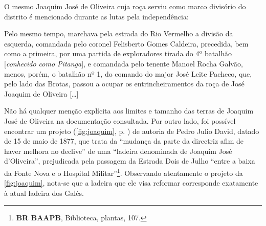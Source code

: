 O mesmo Joaquim José de Oliveira cuja roça serviu como marco divisório do distrito é mencionado durante as lutas pela independência:

\begin{citacao}
Pelo mesmo tempo, marchava pela estrada do Rio Vermelho a divisão da esquerda, comandada pelo coronel Felisberto Gomes Caldeira, precedida, bem como a primeira, por uma partida de exploradores tirada do 4º batalhão [\textit{conhecido como Pitanga}], e comandada pelo tenente Manoel Rocha Galvão, menos, porém, o batalhão nº 1, do comando do major José Leite Pacheco, que, pelo lado das Brotas, passou a ocupar os entrincheiramentos da roça de José Joaquim de Oliveira [\dots] \cite[p.~58]{vieira_memorias_1903}
\end{citacao}

Não há qualquer menção explícita aos limites e tamanho das terras de Joaquim José de Oliveira na documentação consultada. Por outro lado, foi possível encontrar um projeto (\autoref{fig:joaquim}, p. \pageref{fig:joaquim}) de autoria de Pedro Julio David, datado de 15 de maio de 1877, que trata da ``mudança da parte da directriz afim de haver melhora no declive'' de uma ``ladeira denominada de Joaquim José d'Oliveira'', prejudicada pela passagem da Estrada Dois de Julho ``entre a baixa da Fonte Nova e o Hospital Militar''\footnote{\textbf{BR BAAPB}, Biblioteca, plantas, 107.}. Observando atentamente o projeto da \autoref{fig:joaquim}, nota-se que a ladeira que ele visa reformar corresponde exatamente à atual ladeira dos Galés.

